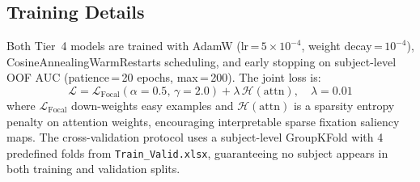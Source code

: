 \subsection{Training Details}
Both Tier~4 models are trained with AdamW (lr\,=\,$5{\times}10^{-4}$, weight decay\,=\,$10^{-4}$), CosineAnnealingWarmRestarts scheduling, and early stopping on subject-level OOF AUC (patience\,=\,20 epochs, max\,=\,200). The joint loss is:
\begin{equation}
    \mathcal{L} = \mathcal{L}_\text{Focal}(\alpha{=}0.5,\,\gamma{=}2.0) + \lambda\,\mathcal{H}(\text{attn}),\quad \lambda{=}0.01
\end{equation}
where $\mathcal{L}_\text{Focal}$ \cite{lin2017focal} down-weights easy examples and $\mathcal{H}(\text{attn})$ is a sparsity entropy penalty on attention weights, encouraging interpretable sparse fixation saliency maps. The cross-validation protocol uses a subject-level GroupKFold with 4 predefined folds from \texttt{Train\_Valid.xlsx}, guaranteeing no subject appears in both training and validation splits.
